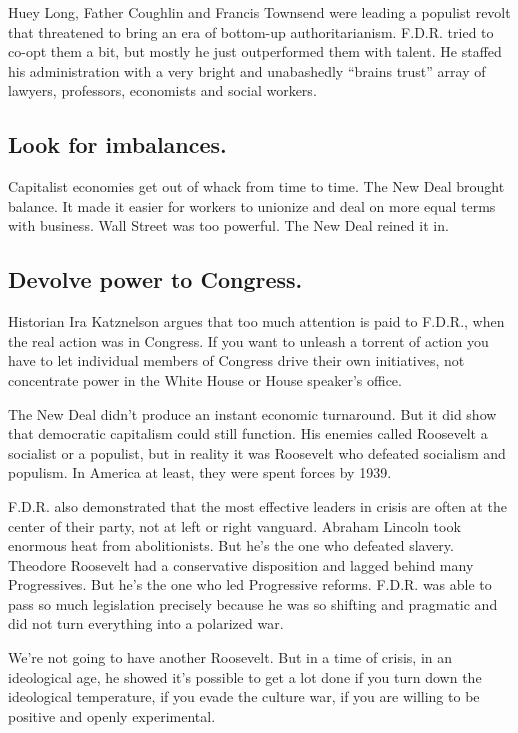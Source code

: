 Huey Long, Father Coughlin and Francis Townsend were leading a populist
revolt that threatened to bring an era of bottom-up authoritarianism.
F.D.R. tried to co-opt them a bit, but mostly he just outperformed them
with talent. He staffed his administration with a very bright and
unabashedly ``brains trust'' array of lawyers, professors, economists
and social workers.

\hypertarget{look-for-imbalances}{%
\subsection{Look for imbalances.}\label{look-for-imbalances}}

Capitalist economies get out of whack from time to time. The New Deal
brought balance. It made it easier for workers to unionize and deal on
more equal terms with business. Wall Street was too powerful. The New
Deal reined it in.

\hypertarget{devolve-power-to-congress}{%
\subsection{Devolve power to
Congress.}\label{devolve-power-to-congress}}

Historian Ira Katznelson argues that too much attention is paid to
F.D.R., when the real action was in Congress. If you want to unleash a
torrent of action you have to let individual members of Congress drive
their own initiatives, not concentrate power in the White House or House
speaker's office.

The New Deal didn't produce an instant economic turnaround. But it did
show that democratic capitalism could still function. His enemies called
Roosevelt a socialist or a populist, but in reality it was Roosevelt who
defeated socialism and populism. In America at least, they were spent
forces by 1939.

F.D.R. also demonstrated that the most effective leaders in crisis are
often at the center of their party, not at left or right vanguard.
Abraham Lincoln took enormous heat from abolitionists. But he's the one
who defeated slavery. Theodore Roosevelt had a conservative disposition
and lagged behind many Progressives. But he's the one who led
Progressive reforms. F.D.R. was able to pass so much legislation
precisely because he was so shifting and pragmatic and did not turn
everything into a polarized war.

We're not going to have another Roosevelt. But in a time of crisis, in
an ideological age, he showed it's possible to get a lot done if you
turn down the ideological temperature, if you evade the culture war, if
you are willing to be positive and openly experimental.

